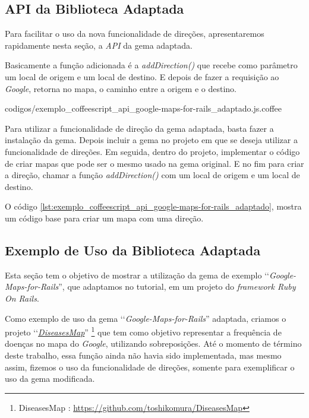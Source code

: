 \subsection{API da Biblioteca Adaptada}
\label{subsection:api_da_biblioteca_adaptada}


Para facilitar o uso da nova funcionalidade de direções, apresentaremos rapidamente nesta seção,
a \emph{API} da gema adaptada.

Basicamente a função adicionada é a \emph{addDirection()} que recebe como parâmetro um local de origem
e um local de destino. E depois de fazer a requisição ao \emph{Google}, retorna no mapa, o caminho entre
a origem e o destino.


{codigos/exemplo_coffeescript_api_google-maps-for-rails_adaptado.js.coffee}

Para utilizar a funcionalidade de direção da gema adaptada, basta fazer a instalação da gema. Depois incluir
a gema no projeto em que se deseja utilizar a funcionalidade de direções. Em seguida, dentro do projeto,
implementar o código de criar mapas que pode ser o mesmo usado na gema original.
E no fim para criar a direção, chamar a função \emph{addDirection()} com um local de origem e um local de destino.

O código \ref{lst:exemplo_coffeescript_api_google-maps-for-rails_adaptado}, mostra um código base para criar um
mapa com uma direção.


\subsection{Exemplo de Uso da Biblioteca Adaptada}
\label{subsection:exemplo_de_uso_da_biblioteca_adaptada}

Esta seção tem o objetivo de mostrar a utilização da gema de exemplo ‘‘\emph{Google-Maps-for-Rails}'',
que adaptamos no tutorial, em um projeto do \emph{framework Ruby On Rails}.

Como exemplo de uso da gema ‘‘\emph{Google-Maps-for-Rails}'' adaptada, criamos o projeto
‘‘\emph{\href{https://github.com/toshikomura/DiseasesMap}{DiseasesMap}}''
\footnote{DiseasesMap : \url{https://github.com/toshikomura/DiseasesMap}} que tem como objetivo representar
a frequência de doenças no mapa do \emph{Google}, utilizando sobreposições. Até o momento de término deste
trabalho, essa função ainda não havia sido implementada, mas mesmo assim, fizemos o uso da
funcionalidade de direções, somente para exemplificar o uso da gema modificada.

